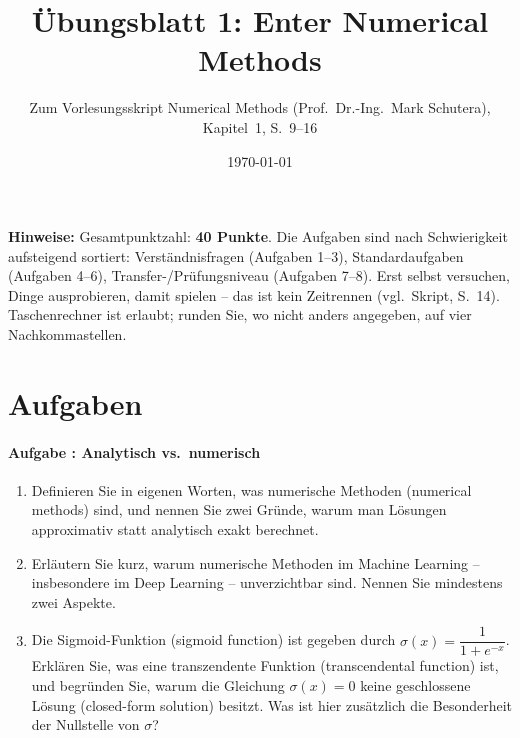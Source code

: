 \documentclass[11pt,a4paper]{scrartcl}
\title{Übungsblatt 1: Enter Numerical Methods}
\subtitle{Zum Vorlesungsskript \glqq Numerical Methods\grqq{} (Prof.\ Dr.-Ing.\ Mark Schutera), Kapitel~1, S.~9--16}
\author{}
\date{\today}
\newcounter{aufgabe}
\newcommand{\aufgabe}[2]{%
  \refstepcounter{aufgabe}%
  \paragraph{Aufgabe \theaufgabe: #1 \normalfont\mdseries[#2]}}
\begin{document}
\maketitle

\noindent\textbf{Hinweise:} Gesamtpunktzahl: \textbf{40 Punkte}. Die Aufgaben sind nach
Schwierigkeit aufsteigend sortiert: Verständnisfragen (Aufgaben 1--3), Standardaufgaben
(Aufgaben 4--6), Transfer-/Prüfungsniveau (Aufgaben 7--8). Erst selbst versuchen, Dinge
ausprobieren, damit spielen -- das ist kein Zeitrennen (vgl.\ Skript, S.~14). Taschenrechner
ist erlaubt; runden Sie, wo nicht anders angegeben, auf vier Nachkommastellen.

\section*{Aufgaben}

\aufgabe{Analytisch vs.\ numerisch}{4 Punkte}\label{auf:1}
\begin{enumerate}[label=\alph*),itemsep=2pt]
  \item Definieren Sie in eigenen Worten, was numerische Methoden (numerical methods)
        sind, und nennen Sie zwei Gründe, warum man Lösungen approximativ statt analytisch
        exakt berechnet.
  \item Erläutern Sie kurz, warum numerische Methoden im Machine Learning -- insbesondere
        im Deep Learning -- unverzichtbar sind. Nennen Sie mindestens zwei Aspekte.
  \item Die Sigmoid-Funktion (sigmoid function) ist gegeben durch
        $\sigma(x) = \dfrac{1}{1 + e^{-x}}$.
        Erklären Sie, was eine transzendente Funktion (transcendental function) ist, und
        begründen Sie, warum die Gleichung $\sigma(x) = 0$ keine geschlossene Lösung
        (closed-form solution) besitzt. Was ist hier zusätzlich die Besonderheit der
        \glqq Nullstelle\grqq{} von $\sigma$?
\end{enumerate}
\end{document}
